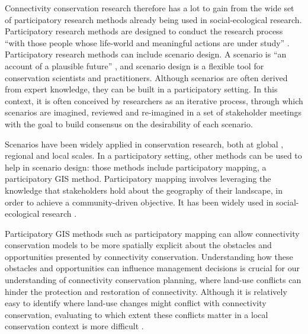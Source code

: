 Connectivity conservation research therefore has a lot to gain from the wide set of participatory research methods already being used in social-ecological research. Participatory research methods are designed to conduct the research process “with those people whose life-world and meaningful actions are under study” \citep{bergold_participatory_2012}. Participatory research methods can include scenario design. A scenario is “an account of a plausible future” \citep{peterson_scenario_2003}, and scenario design is a flexible tool for conservation scientists and practitioners. Although scenarios are often derived from expert knowledge, they can be built in a participatory setting. In this context, it is often conceived by researchers as an iterative process, through which scenarios are imagined, reviewed and re-imagined in a set of stakeholder meetings with the goal to build consensus on the desirability of each scenario. 

Scenarios have been widely applied in conservation research, both at global \citep{tscharntke_global_2012, brussaard_reconciling_2010}, regional and local \citep{carlson_scenario_2011, delevaux_scenario_2018} scales. In a participatory setting, other methods can be used to help in scenario design: those methods include participatory mapping, a participatory GIS method. Participatory mapping involves leveraging the knowledge that stakeholders hold about the geography of their landscape, in order to achieve a community-driven objective. It has been widely used in social-ecological research \citep{plieninger_assessing_2013, lynam_review_2007}. 

Participatory GIS methods such as participatory mapping can allow connectivity conservation models to be more spatially explicit about the obstacles and opportunities presented by connectivity conservation. Understanding how these obstacles and opportunities can influence management decisions is crucial for our understanding of connectivity conservation planning, where land-use conflicts can hinder the protection and restoration of connectivity. Although it is relatively easy to identify where land-use changes might conflict with connectivity conservation, evaluating to which extent these conflicts matter in a local conservation context is more difficult \cite{mitchell_monteregie_2015}.

